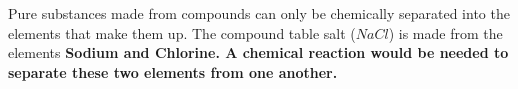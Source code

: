 \begin{definition}
    Pure substances made from compounds can only be chemically separated into
    the elements that make them up. The compound table salt ($NaCl$) is made
    from the elements \bf{Sodium} and \bf{Chlorine}. A chemical
    reaction would be needed to separate these two elements from one another.
\end{definition}

\newpage
